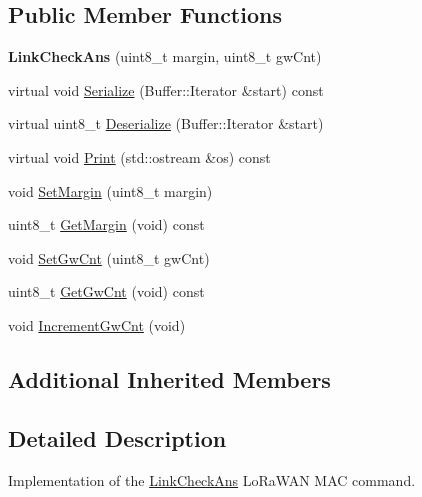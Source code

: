 \subsection*{Public Member Functions}
\begin{DoxyCompactItemize}
\item 
\mbox{\label{classns3_1_1lorawan_1_1LinkCheckAns_a90b6b5ce1302e96dc9bfdce1e166a97f}} 
{\bfseries Link\+Check\+Ans} (uint8\+\_\+t margin, uint8\+\_\+t gw\+Cnt)
\item 
virtual void \hyperlink{classns3_1_1lorawan_1_1LinkCheckAns_a54d7dcbbf322ece82652a5ac3603f83c}{Serialize} (Buffer\+::\+Iterator \&start) const
\item 
virtual uint8\+\_\+t \hyperlink{classns3_1_1lorawan_1_1LinkCheckAns_a6e3087a8b109129cb3e53f29625f9fbf}{Deserialize} (Buffer\+::\+Iterator \&start)
\item 
virtual void \hyperlink{classns3_1_1lorawan_1_1LinkCheckAns_a35637426df92297b70b3a7a1beae3326}{Print} (std\+::ostream \&os) const
\item 
void \hyperlink{classns3_1_1lorawan_1_1LinkCheckAns_af217ee3fe5287862f914c04a752672c2}{Set\+Margin} (uint8\+\_\+t margin)
\item 
uint8\+\_\+t \hyperlink{classns3_1_1lorawan_1_1LinkCheckAns_a95dcc4481a030e82f6f3ac12d391d6d5}{Get\+Margin} (void) const
\item 
void \hyperlink{classns3_1_1lorawan_1_1LinkCheckAns_afb84d89f6fa26b9f26250c54120d8f44}{Set\+Gw\+Cnt} (uint8\+\_\+t gw\+Cnt)
\item 
uint8\+\_\+t \hyperlink{classns3_1_1lorawan_1_1LinkCheckAns_a031c9ac33bfac632ff32b1cf2f67232a}{Get\+Gw\+Cnt} (void) const
\item 
void \hyperlink{classns3_1_1lorawan_1_1LinkCheckAns_a0439b17acc2140e08fa274c8199128d7}{Increment\+Gw\+Cnt} (void)
\end{DoxyCompactItemize}
\subsection*{Additional Inherited Members}


\subsection{Detailed Description}
Implementation of the \hyperlink{classns3_1_1lorawan_1_1LinkCheckAns}{Link\+Check\+Ans} Lo\+Ra\+W\+AN M\+AC command.

